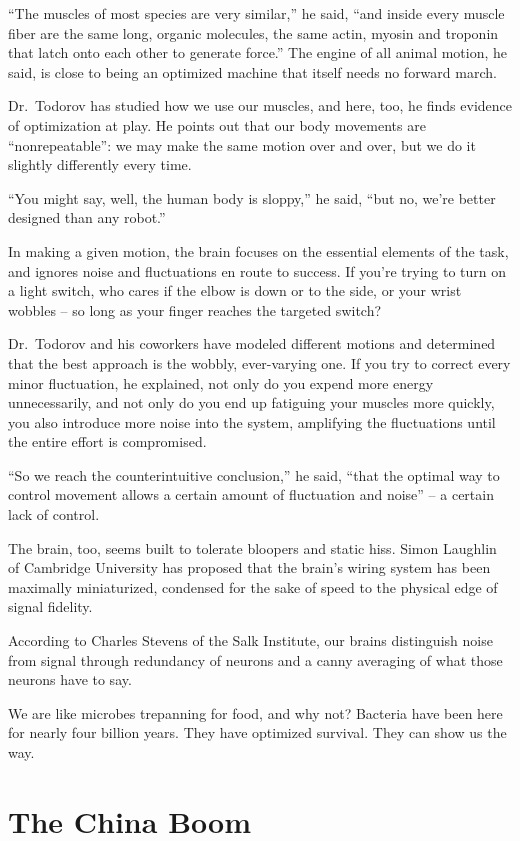 ﻿\documentclass[12pt]{article}
\begin{document}
``The muscles of most species are very similar,'' he said, ``and inside every muscle fiber are the
same long, organic molecules, the same actin, myosin and troponin that latch onto each other to
generate force.'' The engine of all animal motion, he said, is close to being an optimized machine
that itself needs no forward march.

Dr.~Todorov has studied how we use our muscles, and here, too, he finds evidence of optimization at
play. He points out that our body movements are ``nonrepeatable'': we may make the same motion over
and over, but we do it slightly differently every time.

``You might say, well, the human body is sloppy,'' he said, ``but no, we're better designed than any
robot.''

In making a given motion, the brain focuses on the essential elements of the task, and ignores noise
and fluctuations en route to success. If you're trying to turn on a light switch, who cares if the
elbow is down or to the side, or your wrist wobbles -- so long as your finger reaches the targeted
switch?

Dr.~Todorov and his coworkers have modeled different motions and determined that the best approach
is the wobbly, ever-varying one. If you try to correct every minor fluctuation, he explained, not
only do you expend more energy unnecessarily, and not only do you end up fatiguing your muscles more
quickly, you also introduce more noise into the system, amplifying the fluctuations until the entire
effort is compromised.

``So we reach the counterintuitive conclusion,'' he said, ``that the optimal way to control movement
allows a certain amount of fluctuation and noise'' -- a certain lack of control.

The brain, too, seems built to tolerate bloopers and static hiss. Simon Laughlin of Cambridge
University has proposed that the brain's wiring system has been maximally miniaturized, condensed
for the sake of speed to the physical edge of signal fidelity.

According to Charles Stevens of the Salk Institute, our brains distinguish noise from signal through
redundancy of neurons and a canny averaging of what those neurons have to say.

We are like microbes trepanning for food, and why not? Bacteria have been here for nearly four
billion years. They have optimized survival. They can show us the way.

\section{The China Boom}
\end{document}
